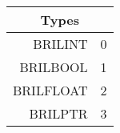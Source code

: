 \begin{tabular}[H!]{|r|l|}\hline
\multicolumn{2}{|c|}{Types}\\ \hline
BRILINT & 0 \\ \hline
BRILBOOL & 1 \\ \hline
BRILFLOAT & 2 \\ \hline
BRILPTR & 3 \\ \hline
\end{tabular}
